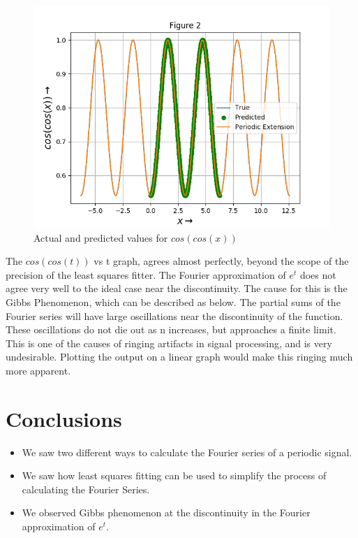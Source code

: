 \documentclass[11pt, a4paper]{article}
\begin{document}
   \begin{figure}[!tbh]
   	\centering
   	\includegraphics[scale=0.6]{Figure_2a.png}   
   	\caption{Actual and predicted values for $cos(cos(x))$}
   	\label{fig:sample}
   \end{figure} 
   The $cos(cos(t))$ vs t graph, agrees almost perfectly, beyond the scope of the precision of the least squares fitter.
The Fourier approximation of $e^{t}$ does not agree very well to the ideal case near the discontinuity. The cause for this is the Gibbs Phenomenon, which can be described as below.
The partial sums of the Fourier series will have large oscillations near the discontinuity of the function. These oscillations do not die out as n increases, but approaches a finite limit.
This is one of the causes of ringing artifacts in signal processing, and is very undesirable.
Plotting the output on a linear graph would make this ringing much more apparent.
	
\section*{Conclusions}
\begin{itemize}
\item We saw two different ways to calculate the Fourier series of a periodic signal.
\item We saw how least squares fitting can be used to simplify the process of calculating the Fourier Series.
\item We observed Gibbs phenomenon at the discontinuity in the Fourier approximation of $e^{t}$.
\end{itemize}
\end{document}

